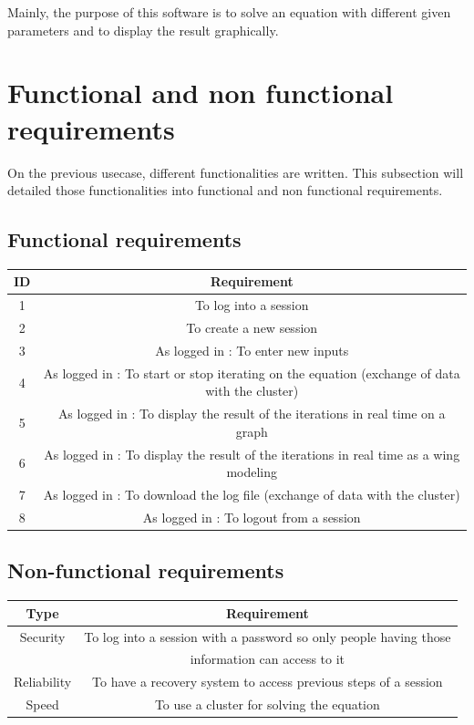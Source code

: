\documentclass[10pt,a4paper]{report}
\begin{document}
Mainly, the purpose of this software is to solve an equation with different given parameters and to display the result graphically.
	\section{Functional and non functional requirements}
On the previous usecase, different functionalities are written. This subsection will detailed those functionalities into functional and non functional requirements.
		\subsection{Functional requirements}
\begin{tabular}{|c|c|}
\hline 
\textbf{ID} & \textbf{Requirement} \\ 
\hline 
1 & To log into a session \\ 
\hline 
2 & To create a new session \\ 
\hline 
3 & As logged in : To enter new inputs \\ 
\hline
4 & As logged in : To start or stop iterating on the equation (exchange of data with the cluster) \\ 
\hline
5 & As logged in : To display the result of the iterations in real time on a graph \\ 
\hline
6 & As logged in : To display the result of the iterations in real time as a wing modeling \\ 
\hline
7 & As logged in : To download the log file (exchange of data with the cluster)\\ 
\hline
8 & As logged in : To logout from a session \\ 
\hline
\end{tabular} 
		\subsection{Non-functional requirements}
\begin{tabular}{|c|c|}
\hline 
\textbf{Type} & \textbf{Requirement} \\ 
\hline 
Security & To log into a session with a password so only people having those\\
 & information can access to it\\ 
\hline 
Reliability & To have a recovery system to access previous steps of a session \\ 
\hline 
Speed & To use a cluster for solving the equation \\ 
\hline
\end{tabular} 
\end{document}
